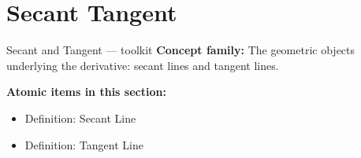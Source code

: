 \section{Secant Tangent}

\begin{toolkitbox}{Secant and Tangent --- toolkit}
\textbf{Concept family:} The geometric objects underlying the derivative: secant lines and tangent lines.

\medskip
\textbf{Atomic items in this section:}
\begin{itemize}
  \item Definition: Secant Line
  \item Definition: Tangent Line
\end{itemize}
\end{toolkitbox}


